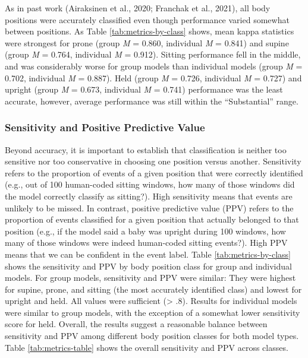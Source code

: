 \documentclass[
  man]{apa6}
\begin{document}
As in past work (Airaksinen et al., 2020; Franchak et al., 2021), all body positions were accurately classified even though performance varied somewhat between positions. As Table \ref{tab:metrics-by-class} shows, mean kappa statistics were strongest for prone (group \emph{M} = 0.860, individual \emph{M} = 0.841) and supine (group \emph{M} = 0.764, individual \emph{M} = 0.912). Sitting performance fell in the middle, and was considerably worse for group models than individual models (group \emph{M} = 0.702, individual \emph{M} = 0.887). Held (group \emph{M} = 0.726, individual \emph{M} = 0.727) and upright (group \emph{M} = 0.673, individual \emph{M} = 0.741) performance was the least accurate, however, average performance was still within the ``Substantial'' range.

\hypertarget{sensitivity-and-positive-predictive-value}{%
\subsubsection{Sensitivity and Positive Predictive Value}\label{sensitivity-and-positive-predictive-value}}

Beyond accuracy, it is important to establish that classification is neither too sensitive nor too conservative in choosing one position versus another. Sensitivity refers to the proportion of events of a given position that were correctly identified (e.g., out of 100 human-coded sitting windows, how many of those windows did the model correctly classify as sitting?). High sensitivity means that events are unlikely to be missed. In contrast, positive predictive value (PPV) refers to the proportion of events classified for a given position that actually belonged to that position (e.g., if the model said a baby was upright during 100 windows, how many of those windows were indeed human-coded sitting events?). High PPV means that we can be confident in the event label. Table \ref{tab:metrics-by-class} shows the sensitivity and PPV by body position class for group and individual models. For group models, sensitivity and PPV were similar: They were highest for supine, prone, and sitting (the most accurately identified class) and lowest for upright and held. All values were sufficient (\textgreater{} .8). Results for individual models were similar to group models, with the exception of a somewhat lower sensitivity score for held. Overall, the results suggest a reasonable balance between sensitivity and PPV among different body position classes for both model types. Table \ref{tab:metrics-table} shows the overall sensitivity and PPV across classes.
\end{document}
